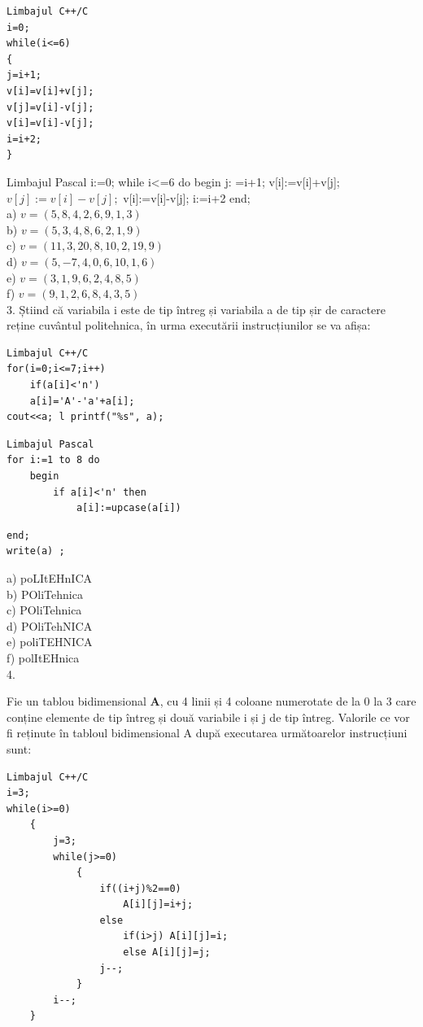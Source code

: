 \documentclass[10pt]{article}
\begin{document}
\begin{verbatim}
Limbajul C++/C
i=0;
while(i<=6)
{
j=i+1;
v[i]=v[i]+v[j];
v[j]=v[i]-v[j];
v[i]=v[i]-v[j];
i=i+2;
}
\end{verbatim}

Limbajul Pascal i:=0; while i<=6 do begin j: =i+1; v[i]:=v[i]+v[j]; $v[j]:=v[i]-v[j] ;$ v[i]:=v[i]-v[j]; i:=i+2 end;\\
a) $v=(5,8,4,2,6,9,1,3)$\\
b) $v=(5,3,4,8,6,2,1,9)$\\
c) $v=(11,3,20,8,10,2,19,9)$\\
d) $v=(5,-7,4,0,6,10,1,6)$\\
e) $v=(3,1,9,6,2,4,8,5)$\\
f) $v=(9,1,2,6,8,4,3,5)$\\
3. Ș̦tiind că variabila i este de tip întreg și variabila a de tip șir de caractere reține cuvântul politehnica, în urma executării instrucțiunilor se va afișa:

\begin{verbatim}
Limbajul C++/C
for(i=0;i<=7;i++)
    if(a[i]<'n')
    a[i]='A'-'a'+a[i];
cout<<a; l printf("%s", a);
\end{verbatim}

\begin{verbatim}
Limbajul Pascal
for i:=1 to 8 do
    begin
        if a[i]<'n' then
            a[i]:=upcase(a[i])
\end{verbatim}

\begin{verbatim}
end;
write(a) ;
\end{verbatim}

a) poLItEHnICA\\
b) POliTehnica\\
c) POliTehnica\\
d) POliTehNICA\\
e) poliTEHNICA\\
f) polItEHnica\\
4.

Fie un tablou bidimensional $\mathbf{A}$, cu 4 linii și 4 coloane numerotate de la 0 la 3 care conține elemente de tip întreg și două variabile i și j de tip întreg. Valorile ce vor fi reținute în tabloul bidimensional A după executarea următoarelor instrucțiuni sunt:

\begin{verbatim}
Limbajul C++/C
i=3;
while(i>=0)
    {
        j=3;
        while(j>=0)
            {
                if((i+j)%2==0)
                    A[i][j]=i+j;
                else
                    if(i>j) A[i][j]=i;
                    else A[i][j]=j;
                j--;
            }
        i--;
    }
\end{verbatim}
\end{document}
